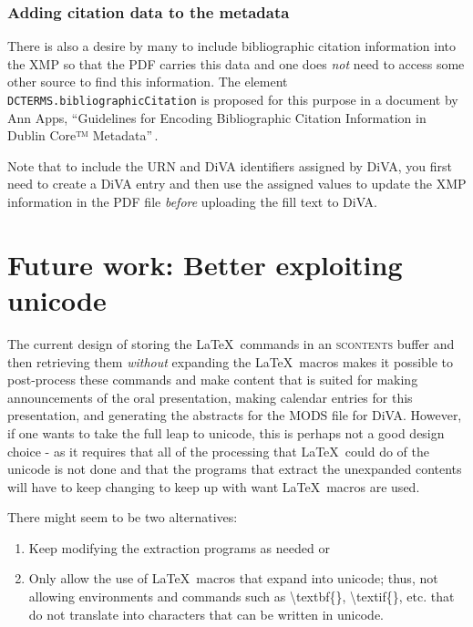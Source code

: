 \subsubsection{Adding citation data to the metadata}
\label{sec:addingCitation}
There is also a desire by many to include bibliographic citation information into the XMP so that the PDF carries this data and one does \emph{not} need to access some other source to find this information. The element \texttt{DCTERMS.bibliographicCitation} is proposed for this purpose in a document by Ann Apps, ``Guidelines for Encoding Bibliographic Citation Information in Dublin Core™ Metadata''\,\cite{Ann_Apps_2005}.

Note that to include the URN and DiVA identifiers assigned by DiVA, you first need to create a DiVA entry and then use the assigned values to update the XMP information in the PDF file \textit{before} uploading the fill text to DiVA.

\section{Future work: Better exploiting unicode}
\label{sec:betterExploitingUnicode}

The current design of storing the \LaTeX\ commands in an \textsc{scontents} buffer and then retrieving them \textit{without} expanding the \LaTeX\ macros makes it possible to post-process these commands and make content that is suited for making announcements of the oral presentation, making calendar entries for this presentation, and generating the abstracts for the MODS file for DiVA. However,  if one wants to take the full leap to unicode, this is perhaps not a good design choice - as it requires that all of the processing that \LaTeX\ could do of the unicode is not done and that the programs that extract the unexpanded contents will have to keep changing to keep up with want \LaTeX\ macros are used. 

There might seem to be two alternatives:
\begin{enumerate}
    \item Keep modifying the extraction programs as needed or
    \item Only allow the use of \LaTeX\ macros that expand into unicode; thus, not allowing environments and commands such as \textbackslash textbf\{\}, \textbackslash textif\{\}, etc. that do not translate into characters that can be written in unicode.
\end{enumerate}

